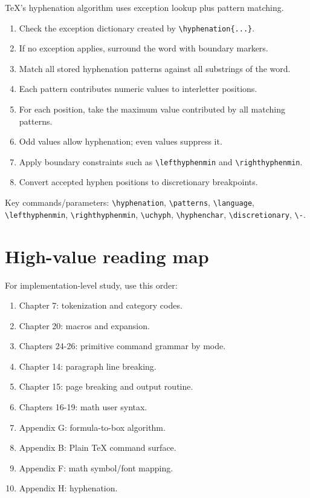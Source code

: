 \documentclass[11pt]{article}
\newcommand{\tightlist}{}
\begin{document}
TeX's hyphenation algorithm uses exception lookup plus pattern matching.

\begin{enumerate}
\def\labelenumi{\arabic{enumi}.}
\tightlist
\item
  Check the exception dictionary created by \texttt{\textbackslash{}hyphenation\{...\}}.
\item
  If no exception applies, surround the word with boundary markers.
\item
  Match all stored hyphenation patterns against all substrings of the word.
\item
  Each pattern contributes numeric values to interletter positions.
\item
  For each position, take the maximum value contributed by all matching patterns.
\item
  Odd values allow hyphenation; even values suppress it.
\item
  Apply boundary constraints such as \texttt{\textbackslash{}lefthyphenmin} and \texttt{\textbackslash{}righthyphenmin}.
\item
  Convert accepted hyphen positions to discretionary breakpoints.
\end{enumerate}

{\raggedright Key commands/parameters: \texttt{\textbackslash{}hyphenation}, \texttt{\textbackslash{}patterns}, \texttt{\textbackslash{}language}, \texttt{\textbackslash{}lefthyphenmin}, \texttt{\textbackslash{}righthyphenmin}, \texttt{\textbackslash{}uchyph}, \texttt{\textbackslash{}hyphenchar}, \texttt{\textbackslash{}discretionary}, \texttt{\textbackslash{}-}.\par}

\section{High-value reading map}\label{high-value-reading-map}

For implementation-level study, use this order:

\begin{enumerate}
\def\labelenumi{\arabic{enumi}.}
\tightlist
\item
  Chapter 7: tokenization and category codes.
\item
  Chapter 20: macros and expansion.
\item
  Chapters 24-26: primitive command grammar by mode.
\item
  Chapter 14: paragraph line breaking.
\item
  Chapter 15: page breaking and output routine.
\item
  Chapters 16-19: math user syntax.
\item
  Appendix G: formula-to-box algorithm.
\item
  Appendix B: Plain TeX command surface.
\item
  Appendix F: math symbol/font mapping.
\item
  Appendix H: hyphenation.
\end{enumerate}
\end{document}
